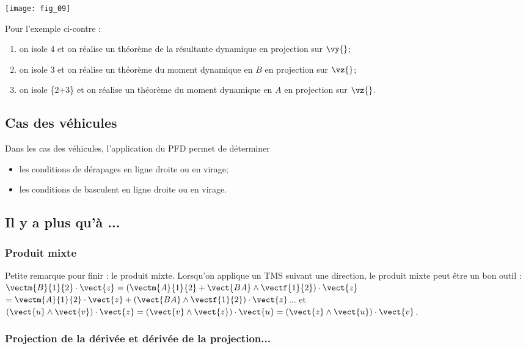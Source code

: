 \begin{marginfigure}
\texttt{[image: fig\_09]}
\end{marginfigure}

Pour l'exemple ci-contre : 
\begin{enumerate}
\item on isole 4 et on réalise un théorème de la résultante dynamique en projection sur $\vy{}$;
\item on isole 3 et on réalise un théorème du moment dynamique en $B$ en projection sur $\vz{}$;
\item on isole \{2+3\} et on réalise un théorème du moment dynamique en $A$ en projection sur $\vz{}$.
\end{enumerate}



\subsection{Cas des véhicules}
Dans les cas des véhicules, l'application du PFD permet de déterminer 
\begin{itemize}
\item les conditions de dérapages en ligne droite ou en virage;
\item les conditions de basculent en ligne droite ou en virage.
\end{itemize}



\subsection{Il y a plus qu'à ...}
\subsubsection{Produit mixte}
Petite remarque pour finir : le produit mixte. Lorsqu'on applique un TMS suivant une direction, le produit mixte peut être un bon outil :
$\vectm{B}{1}{2}\cdot \vect{z} = \left( \vectm{A}{1}{2} + \vect{BA}\wedge \vectf{1}{2}\right)\cdot \vect{z}$
$=  \vectm{A}{1}{2}\cdot \vect{z} + \left(\vect{BA}\wedge \vectf{1}{2}\right)\cdot \vect{z}$...
et $\left(\vect{u} \wedge \vect{v}\right) \cdot \vect{z}= \left(\vect{v} \wedge \vect{z}\right) \cdot \vect{u}= \left(\vect{z} \wedge \vect{u}\right) \cdot \vect{v}$.

\subsubsection{Projection de la dérivée et dérivée de la projection...}